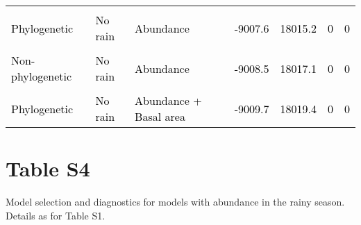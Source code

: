 \documentclass[
  12pt,
  letterpaper,
  DIV=11,
  numbers=noendperiod]{scrartcl}
\begin{document}
\begin{table}[H]
{\begin{tabular}[t]{lllllll}
\addlinespace
\cellcolor{gray!6}{\textcolor{black}{Non-phylogenetic}} & \cellcolor{gray!6}{\textcolor{black}{Rain without interactions}} & \cellcolor{gray!6}{\textcolor{black}{Abundance + Basal area}} & \cellcolor{gray!6}{\textcolor{black}{-9007.6}} & \cellcolor{gray!6}{\textcolor{black}{18015.2}} & \cellcolor{gray!6}{\textcolor{black}{0}} & \cellcolor{gray!6}{\textcolor{black}{0}}\\
\textcolor{black}{Phylogenetic} & \textcolor{black}{No rain} & \textcolor{black}{Abundance} & \textcolor{black}{-9007.6} & \textcolor{black}{18015.2} & \textcolor{black}{0} & \textcolor{black}{0}\\
\cellcolor{gray!6}{\textcolor{black}{Non-phylogenetic}} & \cellcolor{gray!6}{\textcolor{black}{No rain}} & \cellcolor{gray!6}{\textcolor{black}{Basal area}} & \cellcolor{gray!6}{\textcolor{black}{-9008.1}} & \cellcolor{gray!6}{\textcolor{black}{18016.3}} & \cellcolor{gray!6}{\textcolor{black}{0}} & \cellcolor{gray!6}{\textcolor{black}{0}}\\
\textcolor{black}{Non-phylogenetic} & \textcolor{black}{No rain} & \textcolor{black}{Abundance} & \textcolor{black}{-9008.5} & \textcolor{black}{18017.1} & \textcolor{black}{0} & \textcolor{black}{0}\\
\cellcolor{gray!6}{\textcolor{black}{Non-phylogenetic}} & \cellcolor{gray!6}{\textcolor{black}{No rain}} & \cellcolor{gray!6}{\textcolor{black}{Abundance + Basal area}} & \cellcolor{gray!6}{\textcolor{black}{-9009.5}} & \cellcolor{gray!6}{\textcolor{black}{18019.0}} & \cellcolor{gray!6}{\textcolor{black}{0}} & \cellcolor{gray!6}{\textcolor{black}{0}}\\
\addlinespace
\textcolor{black}{Phylogenetic} & \textcolor{black}{No rain} & \textcolor{black}{Abundance + Basal area} & \textcolor{black}{-9009.7} & \textcolor{black}{18019.4} & \textcolor{black}{0} & \textcolor{black}{0}\\
\bottomrule
\end{tabular}}
\end{table}

\newpage

\hypertarget{table-s4}{%
\section{Table S4}\label{table-s4}}

Model selection and diagnostics for models with abundance in the rainy
season. Details as for Table S1.
\end{document}
